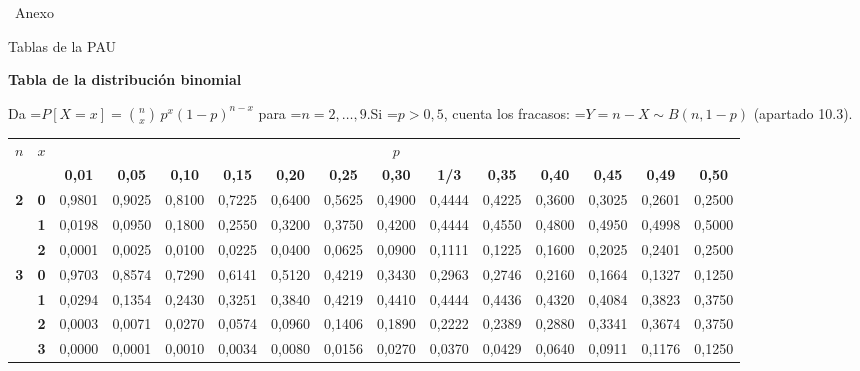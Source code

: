 \documentclass[11pt,a4paper]{article}
\newcommand{\fmm}[1]{\setbox0=\hbox{$#1$}\ifdim\wd0>\linewidth\[#1\]\else\mbox{\box0}\fi}
\begin{document}
  
\clearpage
\hypertarget{annex}{}
{\color{fmnavy}\Large\bfseries\colorbox{fmdef}{\color{white}\strut\ Anexo\ }\hspace{0.6em}Tablas de la PAU\par}\vspace{2pt}{\color{fmdef}\titlerule[1.2pt]}
\vspace{6pt}
\label{tbin}{\color{fmgreen}\large\bfseries Tabla de la distribución binomial}\par\smallskip
Da \fmm{P[X=x]=\binom nx\,p^x(1-p)^{n-x}} para \fmm{n=2,\dots,9}.\newline Si \fmm{p\gt0{,}5}, cuenta los fracasos: \fmm{Y=n-X\sim B(n,1-p)} (apartado 10.3).\par\smallskip
\begin{center}\linespread{1}\selectfont\scriptsize\setlength{\tabcolsep}{4.2pt}\renewcommand{\arraystretch}{1.0}
\begin{tabular}{cc|ccccccccccccc}\toprule
\multirow{2}{*}{$n$} & \multirow{2}{*}{$x$} & \multicolumn{13}{c}{$p$}\\
 & & \textbf{0,01} & \textbf{0,05} & \textbf{0,10} & \textbf{0,15} & \textbf{0,20} & \textbf{0,25} & \textbf{0,30} & \textbf{1/3} & \textbf{0,35} & \textbf{0,40} & \textbf{0,45} & \textbf{0,49} & \textbf{0,50}\\
\midrule
\multirow{3}{*}{\textbf{2}} & \textbf{0} & 0,9801 & 0,9025 & 0,8100 & 0,7225 & 0,6400 & 0,5625 & 0,4900 & 0,4444 & 0,4225 & 0,3600 & 0,3025 & 0,2601 & 0,2500\\
 & \textbf{1} & 0,0198 & 0,0950 & 0,1800 & 0,2550 & 0,3200 & 0,3750 & 0,4200 & 0,4444 & 0,4550 & 0,4800 & 0,4950 & 0,4998 & 0,5000\\
 & \textbf{2} & 0,0001 & 0,0025 & 0,0100 & 0,0225 & 0,0400 & 0,0625 & 0,0900 & 0,1111 & 0,1225 & 0,1600 & 0,2025 & 0,2401 & 0,2500\\
\midrule
\multirow{4}{*}{\textbf{3}} & \textbf{0} & 0,9703 & 0,8574 & 0,7290 & 0,6141 & 0,5120 & 0,4219 & 0,3430 & 0,2963 & 0,2746 & 0,2160 & 0,1664 & 0,1327 & 0,1250\\
 & \textbf{1} & 0,0294 & 0,1354 & 0,2430 & 0,3251 & 0,3840 & 0,4219 & 0,4410 & 0,4444 & 0,4436 & 0,4320 & 0,4084 & 0,3823 & 0,3750\\
 & \textbf{2} & 0,0003 & 0,0071 & 0,0270 & 0,0574 & 0,0960 & 0,1406 & 0,1890 & 0,2222 & 0,2389 & 0,2880 & 0,3341 & 0,3674 & 0,3750\\
 & \textbf{3} & 0,0000 & 0,0001 & 0,0010 & 0,0034 & 0,0080 & 0,0156 & 0,0270 & 0,0370 & 0,0429 & 0,0640 & 0,0911 & 0,1176 & 0,1250\\

\end{tabular}
\end{center}
\end{document}
